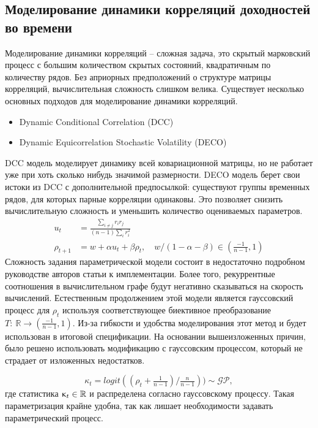 \subsection{Моделирование динамики корреляций доходностей во времени}
Моделирование динамики корреляций -- сложная задача, это скрытый марковский процесс с большим количеством скрытых состояний, квадратичным по количеству рядов. Без априорных предположений о структуре матрицы корреляций, вычислительная сложность слишком велика. Существует несколько основных подходов для моделирование динамики корреляций.
\begin{itemize}
	\item Dynamic Conditional Correlation (DCC) \citep{engle2000}
	\item Dynamic Equicorrelation Stochastic Volatility (DECO) \citep{kurose2016}
\end{itemize}
DCC модель моделирует динамику всей ковариационной матрицы, но не работает уже при хоть сколько нибудь значимой размерности. DECO модель берет свои истоки из DCC с дополнительной предпосылкой: существуют группы временных рядов, для которых парные корреляции одинаковы. Это позволяет снизить вычислительную сложность и уменьшить количество оцениваемых параметров.
\begin{align}
u_t &= \frac{\sum_{i\neq j} r_i r_j}{(n-1) \sum_{i} r_i^2}\\
\rho_{t+1} &= w + \alpha u_t + \beta \rho_t, \quad w/(1-\alpha-\beta) \in \left(\tfrac{-1}{n-1}, 1\right)
\end{align}
Сложность задания параметрической модели состоит в недостаточно подробном руководстве авторов статьи к имплементации. Более того, рекуррентные соотношения в вычислительном графе будут негативно сказываться на скорость вычислений. 
Естественным продолжением этой модели является гауссовский процесс для $\rho_t$ используя соответствующее  биективное преобразование $T:\: \mathbb{R} \to \left(\tfrac{-1}{n-1}, 1\right)$. Из-за гибкости и удобства моделирования этот метод и будет использован в итоговой спецификации.
На основании вышеизложенных причин, было решено использовать модификацию с гауссовским процессом, который не страдает от изложенных недостатков.

\begin{equation}
	\kappa_t = logit((\rho_t + \tfrac{1}{n-1} )/\tfrac{n}{n-1}))  \sim \mathcal{GP},
\end{equation}
где статистика $\upkappa_t \in \mathbb{R}$ и распределена согласно гауссовскому процессу. Такая параметризация крайне удобна, так как лишает необходимости задавать параметрический процесс. 

